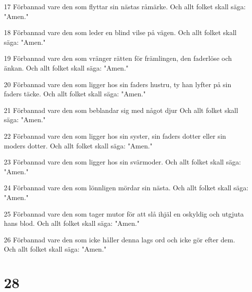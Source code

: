 \par 17 Förbannad vare den som flyttar sin nästas råmärke. Och allt folket skall säga: "Amen."
\par 18 Förbannad vare den som leder en blind vilse på vägen. Och allt folket skall säga: "Amen."
\par 19 Förbannad vare den som vränger rätten för främlingen, den faderlöse och änkan. Och allt folket skall säga: "Amen."
\par 20 Förbannad vare den som ligger hos sin faders hustru, ty han lyfter på sin faders täcke. Och allt folket skall säga: "Amen."
\par 21 Förbannad vare den som beblandar sig med något djur Och allt folket skall säga: "Amen."
\par 22 Förbannad vare den som ligger hos sin syster, sin faders dotter eller sin moders dotter. Och allt folket skall säga: "Amen."
\par 23 Förbannad vare den som ligger hos sin svärmoder. Och allt folket skall säga: "Amen."
\par 24 Förbannad vare den som lönnligen mördar sin nästa. Och allt folket skall säga: "Amen."
\par 25 Förbannad vare den som tager mutor för att slå ihjäl en oskyldig och utgjuta hans blod. Och allt folket skall säga: "Amen."
\par 26 Förbannad vare den som icke håller denna lags ord och icke gör efter dem. Och allt folket skall säga: "Amen."

\chapter{28}

